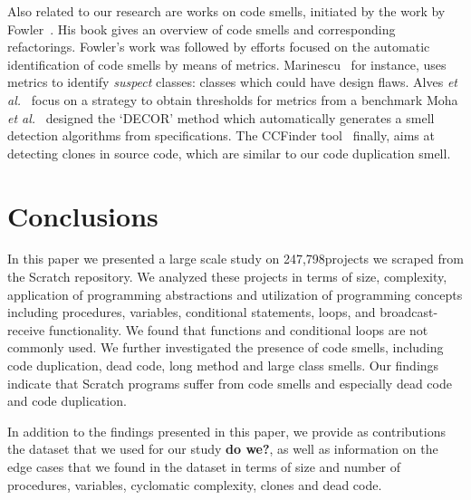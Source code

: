 \documentclass{sig-alternate}
\newcommand{\nAnalyzedPrograms}{247,798}
\newcommand{\todo}[1]{\textbf{#1}}
\begin{document}
Also related to our research are works on code smells, initiated by the work by Fowler~\cite{fowler_refactoring:_1999}. His book gives an overview of code smells and corresponding refactorings. Fowler's work was followed by efforts focused on the automatic identification of code smells by means of metrics. Marinescu~\cite{marinescu_detecting_2001} for instance, uses metrics to identify \emph{suspect} classes: classes which could have design flaws. Alves \emph{et al.}~\cite{alves_deriving_2010} focus on a strategy to obtain thresholds for metrics from a benchmark Moha \emph{et al.}~\cite{moha_decor:_2010} designed the `DECOR' method which automatically generates a smell detection algorithms from specifications. The CCFinder tool~\cite{kamiya_ccfinder:_2002} finally, aims at detecting clones in source code, which are similar to our code duplication smell.

\section{Conclusions}
\label{sec:conclusion}
In this paper we presented a large scale study on \nAnalyzedPrograms projects we scraped from the Scratch repository. We analyzed these projects in terms of size, complexity, application of programming abstractions and utilization of programming concepts including procedures, variables, conditional statements, loops, and broadcast-receive functionality. We found that functions and conditional loops are not commonly used. We further investigated the presence of code smells, including code duplication, dead code, long method and large class smells. Our findings indicate that Scratch programs suffer from code smells and especially dead code and code duplication.

In addition to the findings presented in this paper, we provide as contributions the dataset that we used for our study \todo{do we?}, as well as information on the edge cases that we found in the dataset in terms of size and number of procedures, variables, cyclomatic complexity, clones and dead code.



\end{document}
